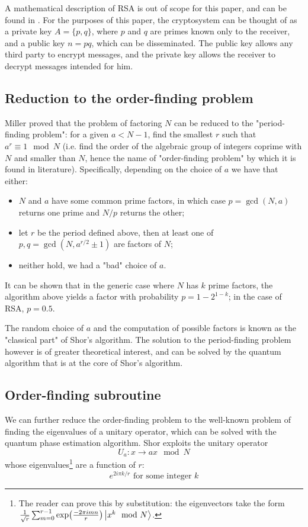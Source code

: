 \documentclass[conference]{IEEEtran}
\begin{document}
A mathematical description of RSA is out of scope for this paper, and can be found in \cite{rsa}. For the purposes of this paper, the cryptosystem can be thought of as a private key $A = \{p, q\}$, where $p$ and $q$ are primes known only to the receiver, and a public key $n=pq$, which can be disseminated. The public key allows any third party to encrypt messages, and the private key allows the receiver to decrypt messages intended for him.

\subsection{Reduction to the order-finding problem}
Miller \cite{miller} proved that the problem of factoring $N$ can be reduced to the "period-finding problem": for a given $a < N - 1$, find the smallest $r$ such that $a^r \equiv 1 \mod N$ (i.e. find the order of the algebraic group of integers coprime with $N$ and smaller than $N$, hence the name of "order-finding problem" by which it is found in literature). Specifically, depending on the choice of $a$ we have that either:
\begin{itemize}
\item $N$ and $a$ have some common prime factors, in which case $p=\gcd(N, a)$ returns one prime and $N/p$ returns the other;
\item let $r$ be the period defined above, then at least one of $p, q = \gcd(N, a^{r/2}\pm 1)$ are factors of $N$;
\item neither hold, we had a "bad" choice of $a$.
\end{itemize}

It can be shown that in the generic case where $N$ has $k$ prime factors, the algorithm above yields a factor with probability $p=1-2^{1-k}$; in the case of RSA, $p=0.5$.

The random choice of $a$ and the computation of possible factors is known as the "classical part" of Shor's algorithm. The solution to the period-finding problem however is of greater theoretical interest, and can be solved by the quantum algorithm that is at the core of Shor's algorithm.

\subsection{Order-finding subroutine}\label{order-finding}
We can further reduce the order-finding problem to the well-known problem of finding the eigenvalues of a unitary operator, which can be solved with the quantum phase estimation algorithm. Shor exploits the unitary operator
\begin{equation}
U_a: x \rightarrow ax \mod N
\end{equation}
whose eigenvalues\footnote{The reader can prove this by substitution: the eigenvectors take the form $\frac{1}{\sqrt{r}}\sum_{m=0}^{r-1}\exp(\frac{-2\pi i m n}{r})\ket{x^k \mod N}$.} are a function of $r$:
\begin{equation}
e^{2i\pi k/r}\text{ for some integer }k
\end{equation}
\end{document}
